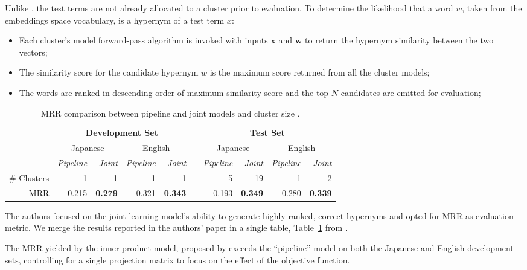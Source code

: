 Unlike \citeauthor{Fu2014, espinosa2016supervised}, the test terms are not already allocated to a cluster prior to evaluation.  To determine the likelihood that a word $w$, taken from the embeddings space vocabulary, is a hypernym of a test term $x$:
\begin{itemize}
    \item Each cluster’s model forward-pass algorithm is invoked with inputs $\bm{x}$ and $\bm{w}$ to return the hypernym similarity between the two vectors;
    \item The similarity score for the candidate hypernym $w$ is the maximum score returned from all the cluster models;
    \item The words are ranked in descending order of maximum similarity score and the top $N$ candidates are emitted for evaluation;
\end{itemize}

\begin{table}\centering
    \begin{tabular}{@{}rrrrrcrrrr@{}} \toprule
    & \multicolumn{4}{c}{\textbf{Development Set}} & \phantom{a} & \multicolumn{4}{c}{\textbf{Test Set}} \\ 
    & \multicolumn{2}{c}{Japanese} & \multicolumn{2}{c}{English} && \multicolumn{2}{c}{Japanese} & \multicolumn{2}{c}{English} \\ 
    \cmidrule{2-5} \cmidrule{7-10}
    & \textit{Pipeline} & \textit{Joint} & \textit{Pipeline} & \textit{Joint} && \textit{Pipeline} & \textit{Joint} & \textit{Pipeline} & \textit{Joint} \\ \midrule
    \# Clusters & 1 & 1 & 1 & 1 && 5 & 19 & 1 & 2 \\
    \ac{MRR} & 0.215 & \textbf{0.279} & 0.321 & \textbf{0.343} && 0.193 & \textbf{0.349} & 0.280 & \textbf{0.339} \\
    \bottomrule
    \end{tabular}
    \caption{MRR comparison between pipeline and joint models and cluster size \citep{yamane2016distributional}.}\label{tab:yamane_results}
\end{table}

The authors focused on the joint-learning model’s ability to generate highly-ranked, correct hypernyms and opted for \ac{MRR} as evaluation metric.  We merge the results reported in the authors' paper in a single table, Table~\ref{tab:yamane_results} from \citet{yamane2016distributional}.

The \ac{MRR} yielded by the inner product model, proposed by \citep{yamane2016distributional} exceeds the “pipeline” model \citep{Fu2014} on both the Japanese and English development sets, controlling for a single projection matrix to focus on the effect of the objective function.  

